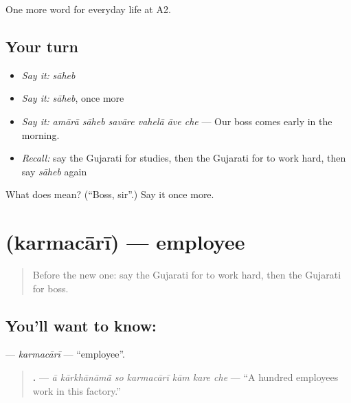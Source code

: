 \begin{grammarlens}[title={What you've built}]
One more word for everyday life at A2.
\end{grammarlens}

\subsection*{Your turn}
\begin{itemize}
\raggedright
  \item \emph{Say it:} \emph{sāheb}
  \item \emph{Say it:} \emph{sāheb}, once more
  \item \emph{Say it:} \emph{amārā sāheb savāre vahelā āve che} — Our boss comes early in the morning.
  \item \emph{Recall:} say the Gujarati for studies, then the Gujarati for to work hard, then say \emph{sāheb} again
\end{itemize}

\begin{tcolorbox}[breakable,colback=teal!4,colframe=teal!35!black,title={Before you move on}]
What does  mean? (\textquotedblleft{}Boss, sir\textquotedblright{}.) Say it once more.
\end{tcolorbox}
\section[\texorpdfstring{\gu{કર્મચારી} (karmacārī)}{કર્મચારી (karmacārī)}]{ (karmacārī) — employee}

\label{lesson:GU-C247-karmacari}



\begin{quote}
Before the new one: say the Gujarati for to work hard, then the Gujarati for boss.
\end{quote}

\subsection*{You'll want to know: }
\textbf{} — \emph{karmacārī} — \textquotedblleft{}employee\textquotedblright{}.

\begin{quote}
\textbf{      .} — \emph{ā kārkhānāmā̃ so karmacārī kām kare che} — \textquotedblleft{}A hundred employees work in this factory.\textquotedblright{}
\end{quote}


